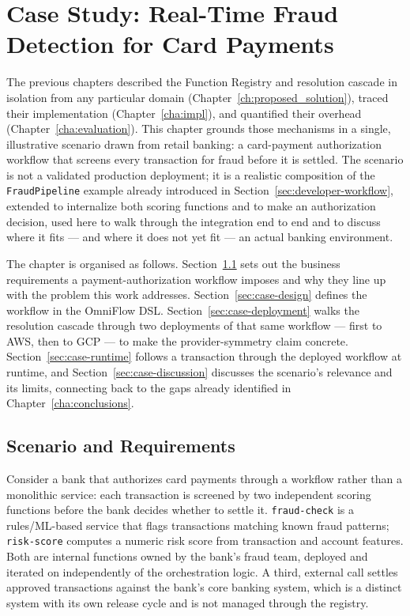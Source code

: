 \chapter{Case Study: Real-Time Fraud Detection for Card Payments}
\label{cha:case-study}

The previous chapters described the Function Registry and resolution cascade in isolation from
any particular domain (Chapter~\ref{ch:proposed_solution}), traced their implementation
(Chapter~\ref{cha:impl}), and quantified their overhead (Chapter~\ref{cha:evaluation}). This
chapter grounds those mechanisms in a single, illustrative scenario drawn from retail banking:
a card-payment authorization workflow that screens every transaction for fraud before it is
settled. The scenario is not a validated production deployment; it is a realistic composition of
the \texttt{FraudPipeline} example already introduced in Section~\ref{sec:developer-workflow},
extended to internalize both scoring functions and to make an authorization decision, used here
to walk through the integration end to end and to discuss where it fits --- and where it does not
yet fit --- an actual banking environment.

The chapter is organised as follows. Section~\ref{sec:case-scenario} sets out the business
requirements a payment-authorization workflow imposes and why they line up with the problem this
work addresses. Section~\ref{sec:case-design} defines the workflow in the OmniFlow DSL.
Section~\ref{sec:case-deployment} walks the resolution cascade through two deployments of that
same workflow --- first to AWS, then to GCP --- to make the provider-symmetry claim concrete.
Section~\ref{sec:case-runtime} follows a transaction through the deployed workflow at runtime, and
Section~\ref{sec:case-discussion} discusses the scenario's relevance and its limits, connecting
back to the gaps already identified in Chapter~\ref{cha:conclusions}.

\section{Scenario and Requirements}
\label{sec:case-scenario}

Consider a bank that authorizes card payments through a workflow rather than a monolithic
service: each transaction is screened by two independent scoring functions before the bank
decides whether to settle it. \texttt{fraud-check} is a rules/ML-based service that flags
transactions matching known fraud patterns; \texttt{risk-score} computes a numeric risk score from
transaction and account features. Both are internal functions owned by the bank's fraud team,
deployed and iterated on independently of the orchestration logic. A third, external call settles
approved transactions against the bank's core banking system, which is a distinct system with its
own release cycle and is not managed through the registry.

